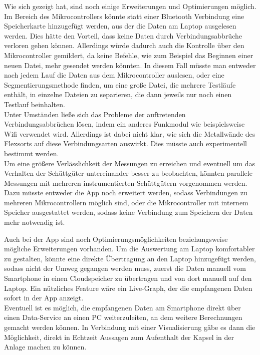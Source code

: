 Wie sich gezeigt hat, sind noch einige Erweiterungen und Optimierungen möglich. 
Im Bereich des Mikrocontrollers könnte statt einer Bluetooth Verbindung eine Speicherkarte hinzugefügt werden, aus der die Daten am Laptop ausgelesen werden. Dies hätte den Vorteil, dass keine Daten durch Verbindungsabbrüche verloren gehen können. Allerdings würde dadurch auch die Kontrolle über den Mikrocontroller gemildert, da keine Befehle, wie zum Beispiel das Beginnen einer neuen Datei, mehr gesendet werden könnten. In diesem Fall müsste man entweder nach jedem Lauf die Daten aus dem Mikrocontroller auslesen, oder eine Segmentierungsmethode finden, um eine große Datei, die mehrere Testläufe enthält, in einzelne Dateien zu separieren, die dann jeweils nur noch einen Testlauf beinhalten. \\
Unter Umständen ließe sich das Probleme der auftretenden Verbindungsabbrüchen lösen, indem ein anderes Funkmodul wie beispielsweise Wifi verwendet wird. Allerdings ist dabei nicht klar, wie sich die Metallwände des Flexsorts auf diese Verbindungsarten auswirkt. Dies müsste auch experimentell bestimmt werden. \\
Um eine größere Verlässlichkeit der Messungen zu erreichen und eventuell um das Verhalten der Schüttgüter untereinander besser zu beobachten, könnten parallele Messungen mit mehreren instrumentierten Schüttgütern vorgenommen werden. Dazu müsste entweder die App noch erweitert werden, sodass Verbindungen zu mehreren Mikrocontrollern möglich sind, oder die Mikrocontroller mit internem Speicher ausgestattet werden, sodass keine Verbindung zum Speichern der Daten mehr notwendig ist.

Auch bei der App sind noch Optimierungsmöglichkeiten beziehungsweise mögliche Erweiterungen vorhanden. Um die Auswertung am Laptop komfortabler zu gestalten, könnte eine direkte Übertragung an den Laptop hinzugefügt werden, sodass nicht der Umweg gegangen werden muss, zuerst die Daten manuell vom Smartphone in einen Cloudspeicher zu übertragen und von dort manuell auf den Laptop. 
Ein nützliches Feature wäre ein Live-Graph, der die empfangenen Daten sofort in der App anzeigt.\\
Eventuell ist es möglich, die empfangenen Daten am Smartphone direkt über einen Data-Service an einen PC weiterzuleiten, an dem weitere Berechnungen gemacht werden können. In Verbindung mit einer Visualisierung gäbe es dann die Möglichkeit, direkt in Echtzeit Aussagen zum Aufenthalt der Kapsel in der Anlage machen zu können. 

